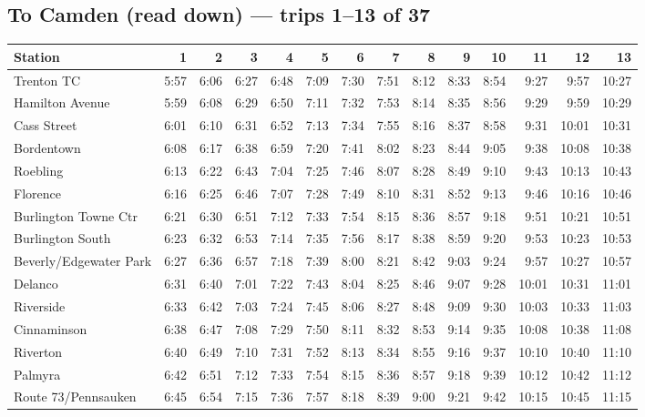\subsection*{To Camden (read down) --- trips 1--13 of 37}
\begin{center}\footnotesize\setlength{\tabcolsep}{3pt}\begin{tabular}{@{}lrrrrrrrrrrrrr@{}}\toprule
Station & 1 & 2 & 3 & 4 & 5 & 6 & 7 & 8 & 9 & 10 & 11 & 12 & 13 \\\midrule
Trenton TC & 5:57 & 6:06 & 6:27 & 6:48 & 7:09 & 7:30 & 7:51 & 8:12 & 8:33 & 8:54 & 9:27 & 9:57 & 10:27 \\
Hamilton Avenue & 5:59 & 6:08 & 6:29 & 6:50 & 7:11 & 7:32 & 7:53 & 8:14 & 8:35 & 8:56 & 9:29 & 9:59 & 10:29 \\
Cass Street & 6:01 & 6:10 & 6:31 & 6:52 & 7:13 & 7:34 & 7:55 & 8:16 & 8:37 & 8:58 & 9:31 & 10:01 & 10:31 \\
Bordentown & 6:08 & 6:17 & 6:38 & 6:59 & 7:20 & 7:41 & 8:02 & 8:23 & 8:44 & 9:05 & 9:38 & 10:08 & 10:38 \\
Roebling & 6:13 & 6:22 & 6:43 & 7:04 & 7:25 & 7:46 & 8:07 & 8:28 & 8:49 & 9:10 & 9:43 & 10:13 & 10:43 \\
Florence & 6:16 & 6:25 & 6:46 & 7:07 & 7:28 & 7:49 & 8:10 & 8:31 & 8:52 & 9:13 & 9:46 & 10:16 & 10:46 \\
Burlington Towne Ctr & 6:21 & 6:30 & 6:51 & 7:12 & 7:33 & 7:54 & 8:15 & 8:36 & 8:57 & 9:18 & 9:51 & 10:21 & 10:51 \\
Burlington South & 6:23 & 6:32 & 6:53 & 7:14 & 7:35 & 7:56 & 8:17 & 8:38 & 8:59 & 9:20 & 9:53 & 10:23 & 10:53 \\
Beverly/Edgewater Park & 6:27 & 6:36 & 6:57 & 7:18 & 7:39 & 8:00 & 8:21 & 8:42 & 9:03 & 9:24 & 9:57 & 10:27 & 10:57 \\
Delanco & 6:31 & 6:40 & 7:01 & 7:22 & 7:43 & 8:04 & 8:25 & 8:46 & 9:07 & 9:28 & 10:01 & 10:31 & 11:01 \\
Riverside & 6:33 & 6:42 & 7:03 & 7:24 & 7:45 & 8:06 & 8:27 & 8:48 & 9:09 & 9:30 & 10:03 & 10:33 & 11:03 \\
Cinnaminson & 6:38 & 6:47 & 7:08 & 7:29 & 7:50 & 8:11 & 8:32 & 8:53 & 9:14 & 9:35 & 10:08 & 10:38 & 11:08 \\
Riverton & 6:40 & 6:49 & 7:10 & 7:31 & 7:52 & 8:13 & 8:34 & 8:55 & 9:16 & 9:37 & 10:10 & 10:40 & 11:10 \\
Palmyra & 6:42 & 6:51 & 7:12 & 7:33 & 7:54 & 8:15 & 8:36 & 8:57 & 9:18 & 9:39 & 10:12 & 10:42 & 11:12 \\
Route 73/Pennsauken & 6:45 & 6:54 & 7:15 & 7:36 & 7:57 & 8:18 & 8:39 & 9:00 & 9:21 & 9:42 & 10:15 & 10:45 & 11:15 \\

\end{tabular}
\end{center}
